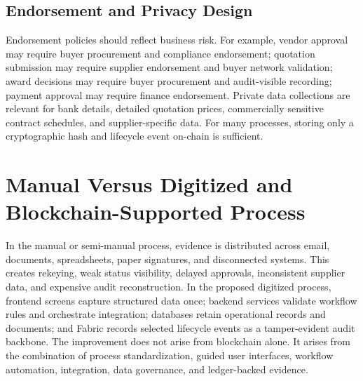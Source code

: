 \documentclass[conference]{IEEEtran}
\begin{document}
\subsection{Endorsement and Privacy Design}
Endorsement policies should reflect business risk. For example, vendor approval may require buyer procurement and compliance endorsement; quotation submission may require supplier endorsement and buyer network validation; award decisions may require buyer procurement and audit-visible recording; payment approval may require finance endorsement. Private data collections are relevant for bank details, detailed quotation prices, commercially sensitive contract schedules, and supplier-specific data. For many processes, storing only a cryptographic hash and lifecycle event on-chain is sufficient.

\section{Manual Versus Digitized and Blockchain-Supported Process}
In the manual or semi-manual process, evidence is distributed across email, documents, spreadsheets, paper signatures, and disconnected systems. This creates rekeying, weak status visibility, delayed approvals, inconsistent supplier data, and expensive audit reconstruction. In the proposed digitized process, frontend screens capture structured data once; backend services validate workflow rules and orchestrate integration; databases retain operational records and documents; and Fabric records selected lifecycle events as a tamper-evident audit backbone. The improvement does not arise from blockchain alone. It arises from the combination of process standardization, guided user interfaces, workflow automation, integration, data governance, and ledger-backed evidence.
\end{document}
